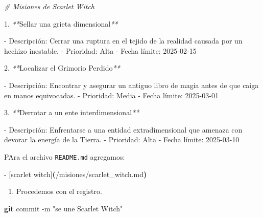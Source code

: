 \documentclass[
]{book}
\newenvironment{Shaded}{\begin{snugshade}}{\end{snugshade}}
\newcommand{\AttributeTok}[1]{\textcolor[rgb]{0.13,0.29,0.53}{#1}}
\newcommand{\CommentTok}[1]{\textcolor[rgb]{0.56,0.35,0.01}{\textit{#1}}}
\newcommand{\ErrorTok}[1]{\textcolor[rgb]{0.64,0.00,0.00}{\textbf{#1}}}
\newcommand{\ExtensionTok}[1]{#1}
\newcommand{\FunctionTok}[1]{\textcolor[rgb]{0.13,0.29,0.53}{\textbf{#1}}}
\newcommand{\KeywordTok}[1]{\textcolor[rgb]{0.13,0.29,0.53}{\textbf{#1}}}
\newcommand{\NormalTok}[1]{#1}
\newcommand{\PreprocessorTok}[1]{\textcolor[rgb]{0.56,0.35,0.01}{\textit{#1}}}
\newcommand{\StringTok}[1]{\textcolor[rgb]{0.31,0.60,0.02}{#1}}
\providecommand{\tightlist}{%
  \setlength{\itemsep}{0pt}\setlength{\parskip}{0pt}}
\begin{document}
\begin{Shaded}
\begin{Highlighting}[]
\CommentTok{\# Misiones de Scarlet Witch}

\ExtensionTok{1.} \PreprocessorTok{**}\NormalTok{Sellar una grieta dimensional}\PreprocessorTok{**}

   \ExtensionTok{{-}}\NormalTok{ Descripción: Cerrar una ruptura en el tejido de la realidad causada por un hechizo inestable.}
   \ExtensionTok{{-}}\NormalTok{ Prioridad: Alta}
   \ExtensionTok{{-}}\NormalTok{ Fecha límite: 2025{-}02{-}15}

\ExtensionTok{2.} \PreprocessorTok{**}\NormalTok{Localizar el Grimorio Perdido}\PreprocessorTok{**}

   \ExtensionTok{{-}}\NormalTok{ Descripción: Encontrar y asegurar un antiguo libro de magia antes de que caiga en manos equivocadas.}
   \ExtensionTok{{-}}\NormalTok{ Prioridad: Media}
   \ExtensionTok{{-}}\NormalTok{ Fecha límite: 2025{-}03{-}01}

\ExtensionTok{3.} \PreprocessorTok{**}\NormalTok{Derrotar a un ente interdimensional}\PreprocessorTok{**}

   \ExtensionTok{{-}}\NormalTok{ Descripción: Enfrentarse a una entidad extradimensional que amenaza con devorar la energía de la Tierra.}
   \ExtensionTok{{-}}\NormalTok{ Prioridad: Alta}
   \ExtensionTok{{-}}\NormalTok{ Fecha límite: 2025{-}03{-}10}
\end{Highlighting}
\end{Shaded}

PAra el archivo \texttt{README.md} agregamos:

\begin{Shaded}
\begin{Highlighting}[]
\ExtensionTok{{-}}\NormalTok{ [scarlet witch]}\ErrorTok{(}\ExtensionTok{/misiones/scarlet\_witch.md}\KeywordTok{)}
\end{Highlighting}
\end{Shaded}

\begin{enumerate}
\def\labelenumi{\arabic{enumi}.}
\setcounter{enumi}{4}
\tightlist
\item
  Procedemos con el registro.
\end{enumerate}

\begin{Shaded}
\begin{Highlighting}[]
\FunctionTok{git}\NormalTok{ commit }\AttributeTok{{-}m} \StringTok{"se une Scarlet Witch"}
\end{Highlighting}
\end{Shaded}
\end{document}

